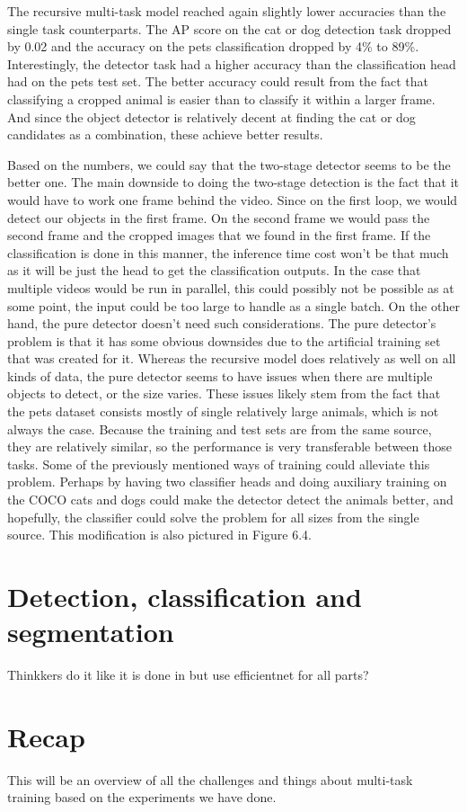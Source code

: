 The recursive multi-task model reached again slightly lower accuracies than the single task counterparts.
The AP score on the cat or dog detection task dropped by 0.02 and the accuracy on the pets classification dropped by 4\% to 89\%.
Interestingly, the detector task had a higher accuracy than the classification head had on the pets test set.
The better accuracy could result from the fact that classifying a cropped animal is easier than to classify it within a larger frame.
And since the object detector is relatively decent at finding the cat or dog candidates as a combination, these achieve better results.

Based on the numbers, we could say that the two-stage detector seems to be the better one.
The main downside to doing the two-stage detection is the fact that it would have to work one frame behind the video.
Since on the first loop, we would detect our objects in the first frame.
On the second frame we would pass the second frame and the cropped images that we found in the first frame.
If the classification is done in this manner, the inference time cost won't be that much as it will be just the head to get the classification outputs.
In the case that multiple videos would be run in parallel, this could possibly not be possible as at some point, the input could be too large to handle as a single batch.
On the other hand, the pure detector doesn't need such considerations.
The pure detector's problem is that it has some obvious downsides due to the artificial training set that was created for it.
Whereas the recursive model does relatively as well on all kinds of data, the pure detector seems to have issues when there are multiple objects to detect, or the size varies.
These issues likely stem from the fact that the pets dataset consists mostly of single relatively large animals, which is not always the case.
Because the training and test sets are from the same source, they are relatively similar, so the performance is very transferable between those tasks.
Some of the previously mentioned ways of training could alleviate this problem.
Perhaps by having two classifier heads and doing auxiliary training on the COCO cats and dogs could make the detector detect the animals better, and hopefully, the classifier could solve the problem for all sizes from the single source.
This modification is also pictured in Figure 6.4.

\section{Detection, classification and segmentation}
Thinkkers do it like it is done in \citep{multinet} but use efficientnet for all parts?

\section{Recap}
This will be an overview of all the challenges and things about multi-task training based on the experiments we have done.